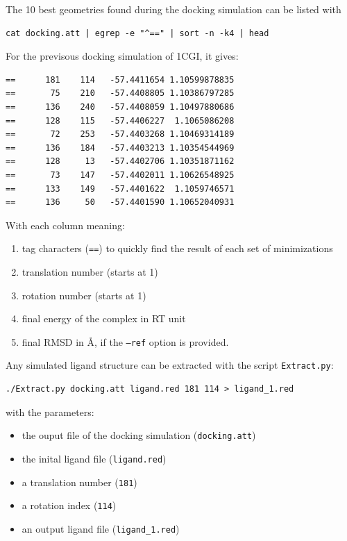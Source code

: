 \documentclass[12pt,a4paper]{article}
\begin{document}
The 10 best geometries found during the docking simulation can be listed with

\begin{verbatim}
cat docking.att | egrep -e "^==" | sort -n -k4 | head
\end{verbatim}

For the previsous docking simulation of 1CGI, it gives:

\begin{verbatim}
==      181    114   -57.4411654 1.10599878835
==       75    210   -57.4408805 1.10386797285
==      136    240   -57.4408059 1.10497880686
==      128    115   -57.4406227  1.1065086208
==       72    253   -57.4403268 1.10469314189
==      136    184   -57.4403213 1.10354544969
==      128     13   -57.4402706 1.10351871162
==       73    147   -57.4402011 1.10626548925
==      133    149   -57.4401622  1.1059746571
==      136     50   -57.4401590 1.10652040931
\end{verbatim}

With each column meaning:
\begin{enumerate}
\item tag characters ({\tt ==}) to quickly find the result of each set of minimizations
\item translation number (starts at 1)
\item rotation number (starts at 1)
\item final energy of the complex in RT unit
\item final RMSD in \AA, if the {\tt --ref} option is provided.
\end{enumerate}

Any simulated ligand structure can be extracted with the script {\tt Extract.py}:

\begin{verbatim}
./Extract.py docking.att ligand.red 181 114 > ligand_1.red
\end{verbatim}

with the parameters:
\begin{itemize}
\item the ouput file of the docking simulation ({\tt docking.att})
\item the inital ligand file ({\tt ligand.red})
\item a translation number ({\tt 181})
\item a rotation index ({\tt 114})
\item an output ligand file ({\tt ligand\_1.red})
\end{itemize}
\end{document}
